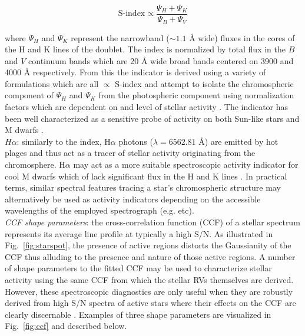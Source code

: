 \begin{equation}
  \text{S-index} \propto \frac{\Psi_H + \Psi_K}{\Psi_B + \Psi_V}
\end{equation}

\noindent where $\Psi_H$ and $\Psi_K$ represent the narrowband
($\sim 1.1$ \AA{} wide) fluxes in the cores of the H and K lines of the \caii{}
doublet. The index is normalized by total flux in the $B$ and $V$ continuum bands
which are 20 \AA{} wide broad bands centered on 3900 and 4000 \AA{} respectively.
From this the \Rhk{} indicator is derived using a variety of formulations which are
all $\propto$ S-index and attempt to isolate the chromospheric component of
$\Psi_H$ and $\Psi_K$ from the photospheric component using normalization factors
which are dependent on \teff{} and level of stellar activity \citep{lovis11}. The
\Rhk{} indicator has been well characterized as a sensitive probe of activity on
both Sun-like stars and M dwarfs
\citep[e.g.][]{wright04,lovis11,astudillodefru17b}. \\

$H\alpha$: 
similarly to the \Rhk{} index, H$\alpha$ photons ($\lambda = 6562.81$ \AA{)} are emitted by
hot plages and thus act as a tracer of stellar activity originating from the chromosphere.
H$\alpha$ may act as a more suitable spectroscopic activity indicator for cool M dwarfs
which of lack significant flux in the \caii{} H and K lines \citep{robertson14}.
In practical terms,  
similar spectral features tracing a star's chromospheric structure may alternatively be used
as activity indicators depending on the accessible wavelengths of the employed spectrograph
(e.g. \hei{,} \nai{,} etc). \\


\emph{CCF shape parameters}:
the cross-correlation function (CCF) of a stellar spectrum represents its average line profile
at typically a high S/N.
As illustrated in Fig.~\ref{fig:starspot}, the presence of active regions distorts
the Gaussianity of the CCF thus alluding to the presence and nature of those active regions.
A number of shape parameters to the fitted CCF may be used to characterize stellar activity
using the same CCF from which the stellar RVs themselves are derived. However, these
spectroscopic diagnostics are only useful when they are robustly derived from high S/N
spectra of active stars where their effects on the CCF are clearly discernable \citep{desort07}.
Examples of three
shape parameters are visualized in Fig.~\ref{fig:ccf} and described below. \\

